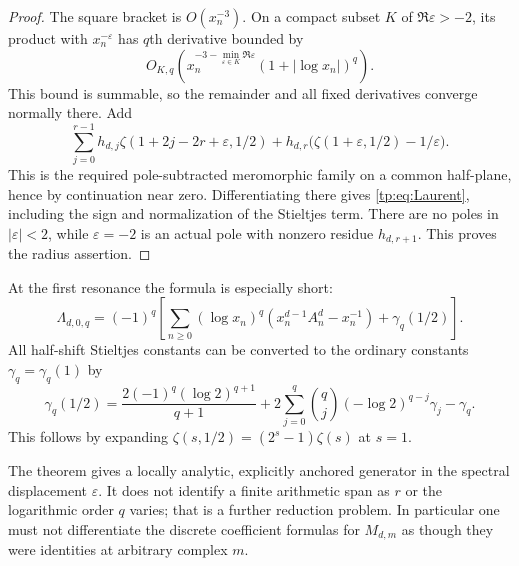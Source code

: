 \documentclass[11pt,a4paper]{article}
\numberwithin{equation}{section}
\theoremstyle{definition}
\theoremstyle{remark}
\begin{document}
\begin{proof}
The square bracket is $O(x_n^{-3})$. On a compact subset $K$ of
$\Re\varepsilon>-2$, its product with $x_n^{-\varepsilon}$ has
$q$th derivative bounded by
\[
 O_{K,q}\!\left(x_n^{-3-\min_{\varepsilon\in K}\Re\varepsilon}
                         (1+|\log x_n|)^q\right).
\]
This bound is summable, so the remainder and all fixed derivatives
converge normally there. Add
\[
 \sum_{j=0}^{r-1}h_{d,j}\zeta(1+2j-2r+\varepsilon,1/2)
 +h_{d,r}\bigl(\zeta(1+\varepsilon,1/2)-1/\varepsilon\bigr).
\]
This is the required pole-subtracted meromorphic family on a common
half-plane, hence by continuation near zero.  Differentiating there
gives \eqref{tp:eq:Laurent}, including the sign and normalization of
the Stieltjes term.  There are no poles in $|\varepsilon|<2$, while
$\varepsilon=-2$ is an actual pole with nonzero residue $h_{d,r+1}$.
This proves the radius assertion.
\end{proof}

At the first resonance the formula is especially short:
\begin{equation}\label{tp:eq:firstresonance}
 \Lambda_{d,0,q}=(-1)^q\left[
 \sum_{n\geq0}(\log x_n)^q
           \left(x_n^{d-1}A_n^d-x_n^{-1}\right)
          +\gamma_q(1/2)\right].
\end{equation}
All half-shift Stieltjes constants can be converted to the ordinary
constants $\gamma_q=\gamma_q(1)$ by
\begin{equation}\label{tp:eq:halfStieltjes}
 \gamma_q(1/2)=
 \frac{2(-1)^q(\log2)^{q+1}}{q+1}
 +2\sum_{j=0}^q\binom qj(-\log2)^{q-j}\gamma_j-\gamma_q.
\end{equation}
This follows by expanding
$\zeta(s,1/2)=(2^s-1)\zeta(s)$ at $s=1$.

The theorem gives a locally analytic, explicitly anchored generator in
the spectral displacement $\varepsilon$.  It does not identify a
finite arithmetic span as $r$ or the logarithmic order $q$ varies;
that is a further reduction problem.  In particular one must not
differentiate the discrete coefficient formulas for $M_{d,m}$ as
though they were identities at arbitrary complex $m$.



\end{document}
